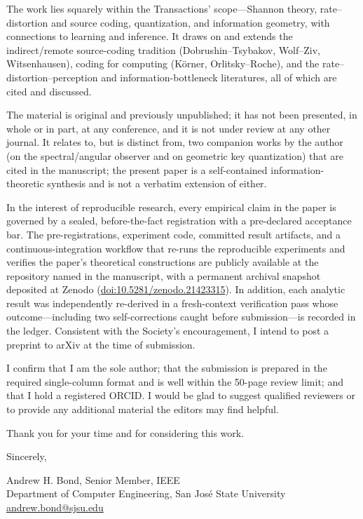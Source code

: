 \documentclass[11pt]{article}
\begin{document}
The work lies squarely within the Transactions' scope---Shannon theory,
rate--distortion and source coding, quantization, and information geometry, with
connections to learning and inference. It draws on and extends the indirect/remote
source-coding tradition (Dobrushin--Tsybakov, Wolf--Ziv, Witsenhausen), coding for
computing (K\"orner, Orlitsky--Roche), and the rate--distortion--perception and
information-bottleneck literatures, all of which are cited and discussed.

The material is original and previously unpublished; it has not been presented, in
whole or in part, at any conference, and it is not under review at any other journal.
It relates to, but is distinct from, two companion works by the author (on the
spectral/angular observer and on geometric key quantization) that are cited in the
manuscript; the present paper is a self-contained information-theoretic synthesis and
is not a verbatim extension of either.

In the interest of reproducible research, every empirical claim in the paper is
governed by a sealed, before-the-fact registration with a pre-declared acceptance bar.
The pre-registrations, experiment code, committed result artifacts, and a
continuous-integration workflow that re-runs the reproducible experiments and verifies
the paper's theoretical constructions are publicly available at the repository named in
the manuscript, with a permanent archival snapshot deposited at Zenodo
(\href{https://doi.org/10.5281/zenodo.21423315}{doi:10.5281/zenodo.21423315}). In addition,
each analytic result was independently re-derived in a fresh-context verification pass whose
outcome---including two self-corrections caught before submission---is recorded in the
ledger. Consistent with the Society's encouragement, I intend to post a preprint to arXiv at
the time of submission.

I confirm that I am the sole author; that the submission is prepared in the required
single-column format and is well within the 50-page review limit; and that I hold a
registered ORCID. I would be glad to suggest qualified reviewers or to provide any
additional material the editors may find helpful.

Thank you for your time and for considering this work.

\bigskip
\noindent Sincerely,

\medskip
\noindent Andrew H. Bond, Senior Member, IEEE\\
Department of Computer Engineering, San Jos\'e State University\\
\href{mailto:andrew.bond@sjsu.edu}{andrew.bond@sjsu.edu}
\end{document}
